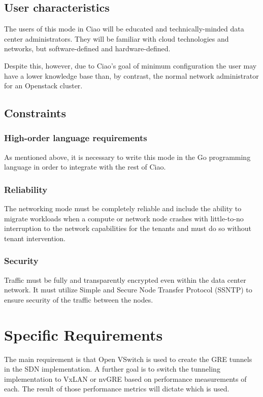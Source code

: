 \documentclass[10pt,letterpaper,onecolumn,draftclsnofoot]{IEEEtran}
\begin{document}
\subsection{User characteristics}

The users of this mode in Ciao will be educated and technically-minded data
center administrators. They will be familiar with cloud technologies and
networks, but software-defined and hardware-defined.

Despite this, however, due to Ciao's goal of minimum configuration the user may
have a lower knowledge base than, by contrast, the normal network administrator
for an Openstack cluster.

\subsection{Constraints}

\subsubsection{High-order language requirements}

As mentioned above, it is necessary to write this mode in the Go programming
language in order to integrate with the rest of Ciao.

\subsubsection{Reliability}

The networking mode must be completely reliable and include the ability to
migrate workloads when a compute or network node crashes with little-to-no
interruption to the network capabilities for the tenants and must do so without
tenant intervention.

\subsubsection{Security}

Traffic must be fully and transparently encrypted even within the data center
network. It must utilize Simple and Secure Node Transfer Protocol (SSNTP) to
ensure security of the traffic between the nodes.

\section{Specific Requirements}

The main requirement is that Open VSwitch is used to create the GRE tunnels in
the SDN implementation. A further goal is to switch the tunneling implementation
to VxLAN or nvGRE based on performance measurements of each. The result of those
performance metrics will dictate which is used.
\end{document}
